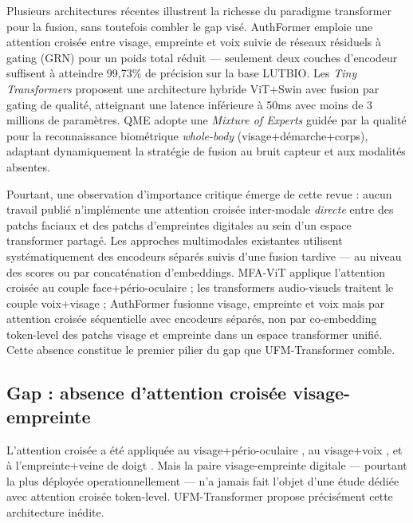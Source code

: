 \documentclass[12pt,a4paper]{report}
\begin{document}
Plusieurs architectures r\'{e}centes illustrent la richesse du paradigme transformer pour la fusion, sans toutefois combler le gap vis\'{e}. AuthFormer \cite{yang2024authformer} emploie une attention crois\'{e}e entre visage, empreinte et voix suivie de r\'{e}seaux r\'{e}siduels \`{a} gating (GRN) pour un poids total r\'{e}duit --- seulement deux couches d'encodeur suffisent \`{a} atteindre 99,73\% de pr\'{e}cision sur la base LUTBIO. Les \textit{Tiny Transformers} \cite{tiny2026transformers} proposent une architecture hybride ViT+Swin avec fusion par gating de qualit\'{e}, atteignant une latence inf\'{e}rieure \`{a} 50ms avec moins de 3 millions de param\`{e}tres. QME \cite{zhu2025qme} adopte une \textit{Mixture of Experts} guid\'{e}e par la qualit\'{e} pour la reconnaissance biom\'{e}trique \textit{whole-body} (visage+d\'{e}marche+corps), adaptant dynamiquement la strat\'{e}gie de fusion au bruit capteur et aux modalit\'{e}s absentes.

Pourtant, une observation d'importance critique \'{e}merge de cette revue : aucun travail publi\'{e} n'impl\'{e}mente une attention crois\'{e}e inter-modale \textit{directe} entre des patchs faciaux et des patchs d'empreintes digitales au sein d'un espace transformer partag\'{e}. Les approches multimodales existantes utilisent syst\'{e}matiquement des encodeurs s\'{e}par\'{e}s suivis d'une fusion tardive --- au niveau des scores ou par concat\'{e}nation d'embeddings. MFA-ViT \cite{tiong2024flexible} applique l'attention crois\'{e}e au couple face+p\'{e}rio-oculaire ; les transformers audio-visuels \cite{gnanapraveen2024cross} traitent le couple voix+visage ; AuthFormer \cite{yang2024authformer} fusionne visage, empreinte et voix mais par attention crois\'{e}e s\'{e}quentielle avec encodeurs s\'{e}par\'{e}s, non par co-embedding token-level des patchs visage et empreinte dans un espace transformer unifi\'{e}. Cette absence constitue le premier pilier du gap que UFM-Transformer comble.

\subsection{Gap : absence d'attention crois\'{e}e visage-empreinte}

L'attention crois\'{e}e a \'{e}t\'{e} appliqu\'{e}e au visage+p\'{e}rio-oculaire \cite{tiong2024flexible}, au visage+voix \cite{gnanapraveen2024cross}, et \`{a} l'empreinte+veine de doigt \cite{wang2022finger}. Mais la paire visage-empreinte digitale --- pourtant la plus d\'{e}ploy\'{e}e operationnellement --- n'a jamais fait l'objet d'une \'{e}tude d\'{e}di\'{e}e avec attention crois\'{e}e token-level. UFM-Transformer propose pr\'{e}cis\'{e}ment cette architecture in\'{e}dite.
\end{document}
